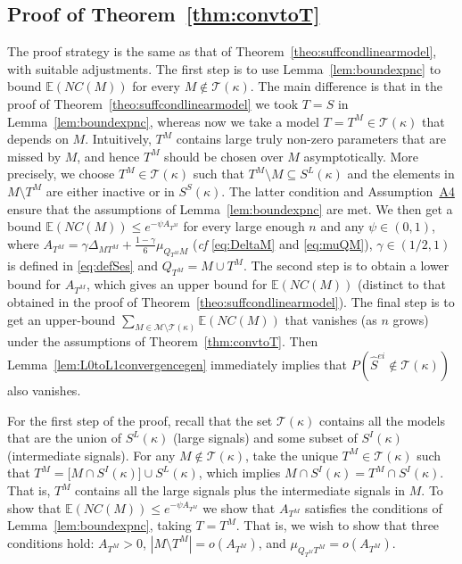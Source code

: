 \documentclass[
  12pt]{article}
\newcommand{\E}{\mathbb{E}}
\newcommand{\M}{\mathcal{M}}
\newcommand{\T}{\mathcal{T}}
\begin{document}
\subsection{Proof of Theorem~\ref{thm:convtoT}}
The proof strategy is the same as that of Theorem~\ref{theo:suffcondlinearmodel}, with suitable adjustments. 
The first step is to use Lemma~\ref{lem:boundexpnc} to bound $\E(NC(M))$ for every $M\not\in \T(\kappa)$. The main difference is that %
in the proof of Theorem~\ref{theo:suffcondlinearmodel} 
we took $T=S$ in Lemma~\ref{lem:boundexpnc}, whereas now we take  a model $T=T^M\in \T(\kappa)$
that depends on $M$. 
Intuitively, $T^M$ contains large truly non-zero parameters that are missed by $M$, and hence $T^M$ should be chosen over $M$ asymptotically. More precisely,
we choose $T^M\in \T(\kappa)$ such that %
$T^M\setminus M\subseteq S^L(\kappa)$ and the elements in $M\setminus T^M$ are either inactive or in $S^S(\kappa)$. The latter condition %
and Assumption~\hyperlink{lab:A4}{A4} ensure that the assumptions of Lemma~\ref{lem:boundexpnc} are met. We then get a bound $\E(NC(M)) \leq e^{-\psi A_{T^M}}$ for every large enough $n$ and any $\psi \in (0,1)$, where $A_{T^M}=\gamma\Delta_{MT^M}+\tfrac{1-\gamma}{6}\mu_{Q_{T^M}M}$ (\emph{cf} \eqref{eq:DeltaM} and \eqref{eq:muQM}), $\gamma\in(1/2,1)$ is defined in \eqref{eq:defSes} and $Q_{T^M}= M\cup T^M$. The second step is to obtain a lower bound for $A_{T^M}$, which gives an upper bound for $\E(NC(M))$ (distinct to that obtained in the proof of Theorem~\ref{theo:suffcondlinearmodel}).
The final step is to %
get an upper-bound $\sum_{M \in \M\setminus \T(\kappa)} \E\left(NC(M)\right)$ that vanishes (as $n$ grows) under the assumptions of Theorem~\ref{thm:convtoT}. Then Lemma~\ref{lem:L0toL1convergencegen} immediately implies that $P(\hat{S}^{ei}\not \in \T(\kappa))$ also vanishes.

For the first step of the proof, recall that the set $\T(\kappa)$ contains all the models that are the union of $S^L(\kappa)$ (large signals) and some subset of $S^{I}(\kappa)$ (intermediate signals). For any $M \not\in\T(\kappa)$, take the unique $T^M\in\T(\kappa)$ such that $T^M = \big[M\cap S^{I}(\kappa)\big]\cup S^L(\kappa) $, which implies $M\cap S^{I}(\kappa)=T^M\cap S^{I}(\kappa)$. 
That is, $T^M$ contains all the large signals plus the intermediate signals in $M$.
To show that $\E(NC(M)) \leq e^{-\psi A_{T^M}}$ we show that $A_{T^M}$ satisfies the conditions of Lemma~\ref{lem:boundexpnc}, taking $T=T^M$. That is, we wish to show that three conditions hold: $A_{T^M}>0$, $|M\setminus T^M|=o(A_{T^M})$, and $\mu_{Q_{T^M} T^M}=o(A_{T^M})$.
\end{document}
